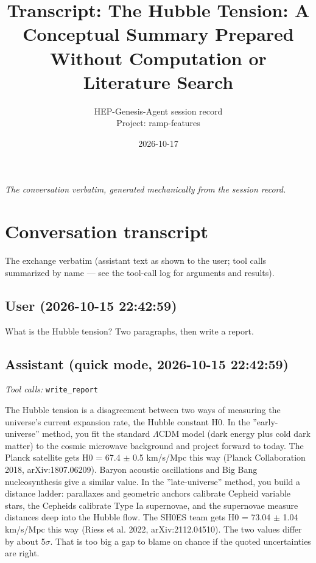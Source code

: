 \documentclass[11pt,a4paper]{article}
\title{Transcript: The Hubble Tension: A Conceptual Summary Prepared Without Computation or Literature Search}
\author{HEP-Genesis-Agent session record \\ \small Project: ramp-features}
\date{2026-10-17}
\begin{document}
\maketitle
\noindent\textit{\small The conversation verbatim, generated mechanically from the session record.}
\vspace{1em}



\appendix
\section{Conversation transcript}
\label{app:transcript}
The exchange verbatim (assistant text as shown to the user; tool calls summarized by name --- see the tool-call log for arguments and results).
\subsection*{User \small(2026-10-15 22:42:59)}
What is the Hubble tension? Two paragraphs, then write a report.

\subsection*{Assistant \small(quick mode, 2026-10-15 22:42:59)}
\textit{Tool calls:} \texttt{write\_report}\par
The Hubble tension is a disagreement between two ways of measuring the universe's current expansion rate, the Hubble constant H0. In the ''early-universe'' method, you fit the standard $\Lambda$CDM model (dark energy plus cold dark matter) to the cosmic microwave background and project forward to today. The Planck satellite gets H0 = 67.4 $\pm$ 0.5 km/s/Mpc this way (Planck Collaboration 2018, arXiv:1807.06209). Baryon acoustic oscillations and Big Bang nucleosynthesis give a similar value. In the ''late-universe'' method, you build a distance ladder: parallaxes and geometric anchors calibrate Cepheid variable stars, the Cepheids calibrate Type Ia supernovae, and the supernovae measure distances deep into the Hubble flow. The SH0ES team gets H0 = 73.04 $\pm$ 1.04 km/s/Mpc this way (Riess et al. 2022, arXiv:2112.04510). The two values differ by about 5$\sigma$. That is too big a gap to blame on chance if the quoted uncertainties are right.
\end{document}
